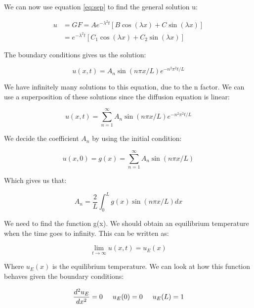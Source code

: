 \documentclass{article}
\begin{document}
We can now use equation \ref{eq:sep} to find the general solution u:

\begin{equation}
\begin{split}
u &= GF = Ae^{-\lambda^2 t} [B\cos{(\lambda x)} + C\sin{(\lambda x)}]\\
&=e^{-\lambda^2 t} [C_1\cos{(\lambda x)} + C_2\sin{(\lambda x)}]
\end{split}
\end{equation}

The boundary conditions gives us the solution:

\begin{equation}
u(x,t) = A_n\sin{(n\pi x/L)}e^{-n^2\pi^2t/L}
\end{equation}

We have infinitely many solutions to this equation, due to the n factor. We can use a superposition of these solutions since the diffusion equation is linear:

\begin{equation}
u(x,t) = \sum_{n=1}^{\infty}A_n\sin{(n\pi x/L)}e^{-n^2\pi^2t/L}
\label{eq:u_undfA}
\end{equation}

We decide the coefficient $A_n$ by using the initial condition:

\begin{equation}
u(x,0)=g(x)=\sum_{n=1}^{\infty}A_n\sin{(n\pi x/L)}
\end{equation}

Which gives us that:

\begin{equation*}
A_n=\frac{2}{L}\int_0^Lg(x)\sin{(n\pi x/L)} dx
\end{equation*}

We need to find the function g(x). We should obtain an equilibrium temperature when the time goes to infinity. This can be written as:

\begin{equation*}
\lim_{t \to \infty} u(x,t) = u_E(x)
\end{equation*}

Where $u_E(x)$ is the equilibrium temperature. We can look at how this function behaves given the boundary conditions:

\begin{equation*}
\frac{d^2 u_E}{dx^2}=0 \hspace{0.5cm} u_E(0)=0\hspace{0.5cm} u_E(L)=1
\end{equation*}
\end{document}
